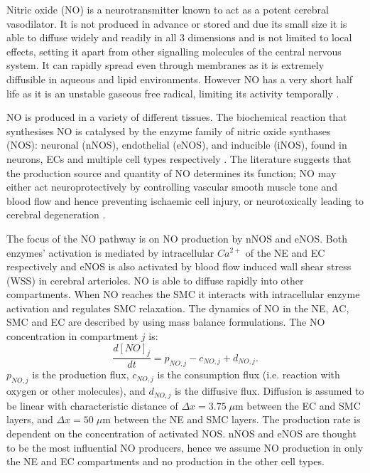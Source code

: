 		Nitric oxide (NO) is a neurotransmitter known to act as a potent cerebral vasodilator. It is not produced in advance or stored and due its small size it is able to diffuse widely and readily in all 3 dimensions and is not limited to local effects, setting it apart from other signalling molecules of the central nervous system. It can rapidly spread even through membranes as it is extremely diffusible in aqueous and lipid environments. However NO has a very short half life as it is an unstable gaseous free radical, limiting its activity temporally \citep{Dobutovic2011} . 
					
		NO is produced in a variety of different tissues. The biochemical reaction that synthesises NO is catalysed by the enzyme family of nitric oxide synthases (NOS): neuronal (nNOS), endothelial (eNOS), and inducible (iNOS), found in neurons, ECs and multiple cell types respectively \citep{Forstermann2006}. 
		The literature suggests that the production source and quantity of NO determines its function; NO may either act neuroprotectively by controlling vascular smooth muscle tone and blood flow and hence preventing ischaemic cell injury, or neurotoxically leading to cerebral degeneration \citep{aurelia2010role}.
				
		The focus of the NO pathway is on NO production by nNOS and eNOS. Both enzymes' activation is mediated by intracellular $Ca^{2+}$ of the NE and EC respectively and eNOS is also activated by blood flow induced wall shear stress (WSS) in cerebral arterioles.
		NO is able to diffuse rapidly into other compartments. When NO reaches the SMC it interacts with intracellular enzyme activation and regulates SMC relaxation. 
		The dynamics of NO in the NE, AC, SMC and EC are described by using mass balance formulations. The NO concentration in compartment $j$ is:
			\begin{equation}
			\frac{d[NO]_j}{dt} = p_{NO,j} - c_{NO,j} + d_{NO,j}.
			\end{equation}
		$ p_{NO,j}$ is the production flux,  $c_{NO,j}$ is the consumption flux (i.e. reaction with oxygen or other molecules), and $d_{NO,j}$ is the diffusive flux. Diffusion is assumed to be linear with characteristic distance of $\Delta x = 3.75 \; \mu$m between the EC and SMC layers, and  $\Delta x = 50 \; \mu$m between the NE and SMC layers.
		The production rate is dependent on the concentration of activated NOS. nNOS and eNOS are thought to be the most influential NO producers, hence we assume NO production in only the NE and EC compartments and no production in the other cell types.
		
